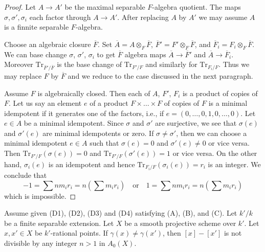 \begin{proof}
Let $A \to A'$ be the maximal separable $F$-algebra quotient.
The maps $\sigma, \sigma', \sigma_i$ each factor through
$A \to A'$. After replacing $A$ by $A'$ we may assume
$A$ is a finnite separable $F$-algebra.

\medskip\noindent
Choose an algebraic closure $\overline{F}$. Set
$\overline{A} = A \otimes_F \overline{F}$,
$\overline{F}' = F' \otimes_F \overline{F}$, and
$\overline{F}_i = F_i \otimes_F \overline{F}$.
We can base change $\sigma$, $\sigma'$, $\sigma_i$
to get $\overline{F}$ algebra maps $\overline{A} \to \overline{F}'$
and $\overline{A} \to \overline{F}_i$. Moreover
$\text{Tr}_{\overline{F}'/\overline{F}}$ is the base
change of $\text{Tr}_{F'/F}$ and similarly for
$\text{Tr}_{F_i/F}$. Thus we may replace
$F$ by $\overline{F}$ and we reduce to the case discussed in
the next paragraph.

\medskip\noindent
Assume $F$ is algebraically closed. Then each of $A$, $F'$, $F_i$
is a product of copies of $F$. Let us say an element $e$ of a product
$F \times \ldots \times F$ of copies of $F$ is a minimal idempotent
if it generates one of the factors, i.e., if
$e = (0, \ldots, 0, 1, 0, \ldots, 0)$. Let $e \in A$ be a minimal idempotent.
Since $\sigma$ and $\sigma'$ 
are surjective, we see that $\sigma(e)$ and $\sigma'(e)$ are minimal
idempotents or zero. If $\sigma \not = \sigma'$, then we can choose
a minimal idempotent $e \in A$ such that $\sigma(e) = 0$ and
$\sigma'(e) \not = 0$ or vice versa. Then
$\text{Tr}_{F'/F}(\sigma(e)) = 0$ and
$\text{Tr}_{F'/F}(\sigma'(e)) = 1$ or vice versa.
On the other hand, $\sigma_i(e)$ is an idempotent
and hence $\text{Tr}_{F_i/F}(\sigma_i(e)) = r_i$ is an integer.
We conclude that
$$
-1 = \sum n m_i r_i = n (\sum m_i r_i)
\quad\text{or}\quad
1 = \sum n m_i r_i = n (\sum m_i r_i)
$$
which is impossible.
\end{proof}

\begin{lemma}
\label{lemma-relations-classes-points}
Assume given (D1), (D2), (D3) and (D4) satisfying (A), (B), and (C).
Let $k'/k$ be a finite separable extension.
Let $X$ be a smooth projective scheme over $k'$.
Let $x, x' \in X$ be $k'$-rational points.
If $\gamma(x) \not = \gamma(x')$, then
$[x] - [x']$ is not divisible by any integer $n > 1$ in $A_0(X)$.
\end{lemma}

